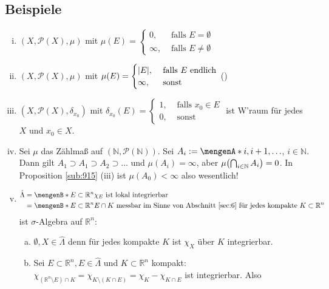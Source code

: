 \subsection[Beispiele für Maßräume]{Beispiele} %
\label{sub:916}
\begin{enumerate}[(i)]
	\item $(X, \mathcal{P}(X),  \mu)$ mit $\mu(E) = \begin{cases}
			0, &\text{ falls }E = \emptyset\\
			\infty, &\text{ falls } E \not= \emptyset
		\end{cases}$
	\item $(X, \mathcal{P}(X),  \mu)$ mit $\mu(E) = \begin{cases}
			\abs*{E} , &\text{ falls }E \text{ endlich}\\
			\infty, &\text{ sonst } 
		\end{cases} $ \hfill ()
	\item $(X, \mathcal{P}(X), \delta_{x_0})$ mit $\delta_{x_0}(E) = \begin{cases}
		1, &\text{ falls }x_0 \in E\\
		0 , &\text{ sonst}
	\end{cases}$ ist W'raum für jedes $X$ und $x_0 \in X$.
	\item Sei $\mu$ das Zählmaß auf $(\mathds{N}, \mathcal{P}(\mathds{N}))$. Sei $A_i := \set{i, i+1, \ldots } $, $i \in \mathds{N}$. Dann gilt 
	$A_1 \supset A_1 \supset A_2 \supset \ldots $ und $\mu (A_i) = \infty$, aber $\mu \enbrace*{\bigcap_{i \in \mathds{N}} A_i} = 0$. In Proposition \ref{sub:915} (iii) ist
	$\mu(A_0)< \infty$ also wesentlich!
	\item \begin{align*}
		\hat \Lambda &= \set[E \subset \mathds{R}^n]{\chi_E \text{ ist lokal integrierbar}} \\
		&= \set[E \subset \mathds{R}^n]{E \cap K \text{ messbar im Sinne von Abschnitt \ref{sec:6} für jedes kompakte }K  \subset \mathds{R}^n} 
	\end{align*}
	ist $\sigma$-Algebra auf $\mathds{R}^n$:
	\begin{enumerate}[a)]
		\item $\emptyset, X \in \hat \Lambda$ denn für jedes kompakte $K$ ist $\chi_X$ über $K$ integrierbar.
		\item Sei $E \subset \mathds{R}^n, E \in \hat \Lambda$ und $K \subset \mathds{R}^n$ kompakt: 
		$\chi_{(\mathds{R}^n \setminus E) \cap K} = \chi_{K \setminus (K \cap E)} = \chi_{K} - \chi_{K \cap E}$ ist integrierbar. Also 

\end{enumerate}
\end{enumerate}
